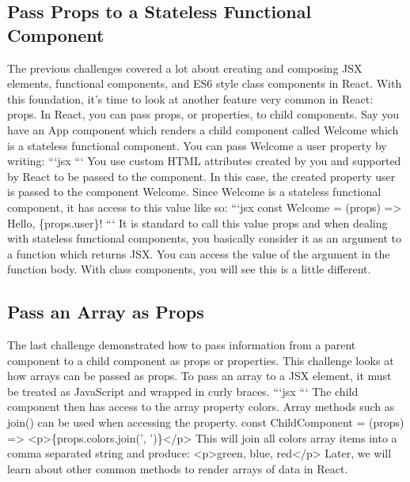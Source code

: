 \documentclass{article}%
\begin{document}
%
\subsection{Pass Props to a Stateless Functional Component}%
\label{subsec:PassPropstoaStatelessFunctionalComponent}%
The previous challenges covered a lot about creating and composing JSX elements, functional components, and ES6 style class components in React. With this foundation, it's time to look at another feature very common in React: props. In React, you can pass props, or properties, to child components. Say you have an App component which renders a child component called Welcome which is a stateless functional component. You can pass Welcome a user property by writing:\newline%
```jsx\newline%
```\newline%
You use custom HTML attributes created by you and supported by React to be passed to the component. In this case, the created property user is passed to the component Welcome. Since Welcome is a stateless functional component, it has access to this value like so:\newline%
```jsx\newline%
const Welcome = (props) => Hello, \{props.user\}!\newline%
```\newline%
It is standard to call this value props and when dealing with stateless functional components, you basically consider it as an argument to a function which returns JSX. You can access the value of the argument in the function body. With class components, you will see this is a little different.\newline%

%
\subsection{Pass an Array as Props}%
\label{subsec:PassanArrayasProps}%
The last challenge demonstrated how to pass information from a parent component to a child component as props or properties. This challenge looks at how arrays can be passed as props.  To pass an array to a JSX element, it must be treated as JavaScript and wrapped in curly braces.\newline%
```jsx\newline%
```\newline%
The child component then has access to the array property colors.  Array methods such as join() can be used when accessing the property.\newline%
const ChildComponent = (props) => <p>\{props.colors.join(', ')\}</p>\newline%
This will join all colors array items into a comma separated string and produce:\newline%
  <p>green, blue, red</p>\newline%
Later, we will learn about other common methods to render arrays of data in React.\newline%
\end{document}

